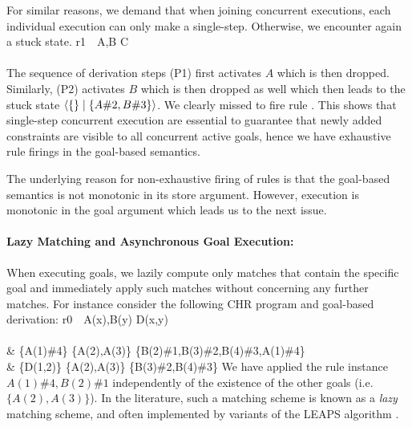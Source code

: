\documentclass{tlp}
\begin{document}
For similar reasons, we demand that when joining concurrent executions, each individual
execution can only make a single-step. Otherwise, we encounter again a stuck state.
   r1~\atsign~A,B \simparrow C \\ \\
           { \partransstar 
             }
\eda
The sequence of derivation steps (P1) first activates $A$ which is then dropped.
Similarly, (P2) activates $B$ which is then dropped as well which then leads to 
the stuck state $\langle \{\}\mid\{A\#2,B\#3\} \rangle$. We clearly missed to fire rule 
. This shows that single-step concurrent execution are essential
to guarantee that newly added constraints are visible to all concurrent active 
goals, hence we have exhaustive rule firings in the goal-based semantics.

The underlying reason for non-exhaustive firing of rules is that the goal-based semantics
is not monotonic in its store argument. However, execution is monotonic 
in the goal argument which leads us to the next issue.

\paragraph{\bf Lazy Matching and Asynchronous Goal Execution:}

When executing goals, we lazily compute only matches that contain the specific 
goal and immediately apply such matches without concerning any further matches.
For instance consider the following CHR program and goal-based derivation:
{\small
{} 
  r0~\atsign~A(x),B(y) \simparrow D(x,y) \\ \\
     & \chrstate
        {\{A(1)\#4\} \uplus \{A(2),A(3)\}}
        {\{B(2)\#1,B(3)\#2,B(4)\#3,A(1)\#4\}} \\
   \goaltrans &
   \chrstate
    {\{D(1,2)\} \uplus \{A(2),A(3)\}}
    {\{B(3)\#2,B(4)\#3\}}
  \ea
\eda
}
We have applied the rule instance $A(1)\#4,B(2)\#1$ independently
of the existence of the other goals (i.e. $\{A(2),A(3)\}$). In the literature, such a matching 
scheme is known as a {\em lazy} matching scheme, and often implemented by variants of 
the LEAPS algorithm \cite{leaps90}. 
\end{document}
